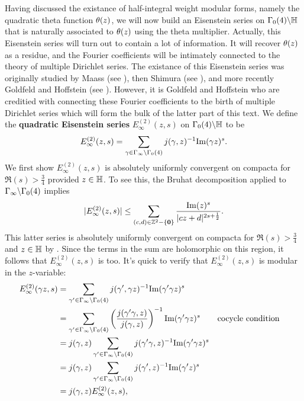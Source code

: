 \documentclass[12pt,oneside]{book}
\begin{document}
    \section{}
      Having discussed the existance of half-integral weight modular forms, namely the quadratic theta function $\theta(z)$, we will now build an Eisenstein series on $\Gamma_{0}(4)\backslash\mathbb{H}$ that is naturally associated to $\theta(z)$ using the theta multiplier. Actually, this Eisenstein series will turn out to contain a lot of information. It will recover $\theta(z)$ as a residue, and the Fourier coefficients will be intimately connected to the theory of multiple Dirichlet series. The existance of this Eisenstein series was originally studied by Maass (see ), then Shimura (see ), and more recently Goldfeld and Hoffstein (see ). However, it is Goldfeld and Hoffstein who are creditied with connecting these Fourier coefficients to the birth of multiple Dirichlet series which will form the bulk of the latter part of this text. We define the \textbf{quadratic Eisenstein series} $E_{\infty}^{(2)}(z,s)$ on $\Gamma_{0}(4)\backslash\mathbb{H}$ to be
      \[
        E_{\infty}^{(2)}(z,s) = \sum_{\gamma \in \Gamma_{\infty}\backslash\Gamma_{0}(4)}j(\gamma,z)^{-1}\mathrm{Im}(\gamma z)^{s}.
      \]
      We first show $E_{\infty}^{(2)}(z,s)$ is absolutely uniformly convergent on compacta for $\Re(s) > \frac{3}{4}$ provided $z \in \mathbb{H}$. To see this, the Bruhat decomposition applied to $\Gamma_{\infty}\backslash\Gamma_{0}(4)$ implies
      \[
        |E_{\infty}^{(2)}(z,s)| \le \sum_{(c,d) \in \mathbb{Z}^{2}-\{\mathbf{0}\}}\frac{\mathrm{Im}(z)^{s}}{|cz+d|^{2s+\frac{1}{2}}}.
      \]
      This latter series is absolutely uniformly convergent on compacta for $\Re(s) > \frac{3}{4}$ and $z \in \mathbb{H}$ by . Since the terms in the sum are holomorphic on this region, it follows that $E_{\infty}^{(2)}(z,s)$ is too. It's quick to verify that $E_{\infty}^{(2)}(z,s)$ is modular in the $z$-variable:
      \begin{align*}
        E_{\infty}^{(2)}(\gamma z,s) &= \sum_{\gamma' \in \Gamma_{\infty}\backslash\Gamma_{0}(4)}j(\gamma',\gamma z)^{-1}\mathrm{Im}(\gamma'\gamma z)^{s} \\
        &= \sum_{\gamma' \in \Gamma_{\infty}\backslash\Gamma_{0}(4)}\left(\frac{j(\gamma'\gamma,z)}{j(\gamma,z)}\right)^{-1}\mathrm{Im}(\gamma'\gamma z)^{s} && \text{cocycle condition} \\
        &= j(\gamma,z)\sum_{\gamma' \in \Gamma_{\infty}\backslash\Gamma_{0}(4)}j(\gamma'\gamma,z)^{-1}\mathrm{Im}(\gamma'\gamma z)^{s} \\
        &= j(\gamma,z)\sum_{\gamma' \in \Gamma_{\infty}\backslash\Gamma_{0}(4)}j(\gamma',z)^{-1}\mathrm{Im}(\gamma'z)^{s} \\
        &= j(\gamma,z)E_{\infty}^{(2)}(z,s),
      \end{align*}
\end{document}
